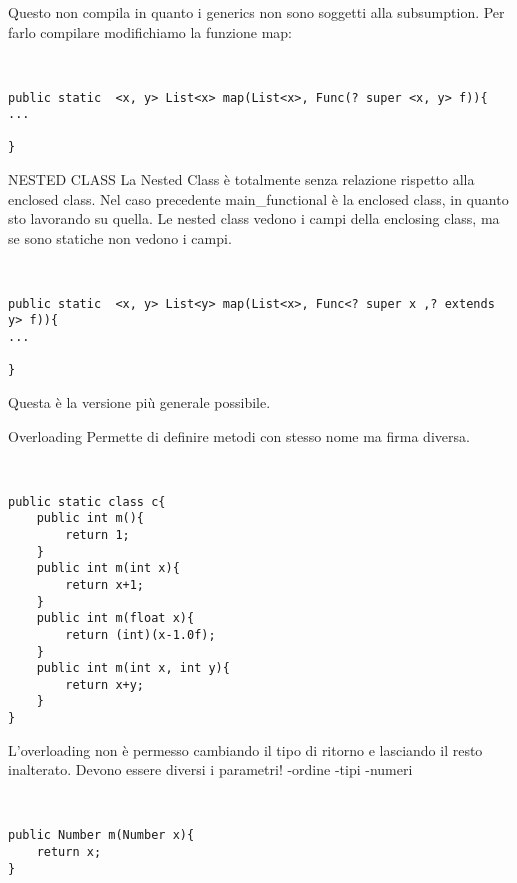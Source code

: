 Questo non compila in quanto i generics non sono soggetti alla subsumption. \newline
Per farlo compilare modifichiamo la funzione map: 


\begin{lstlisting}[basicstyle=\small,]


public static  <x, y> List<x> map(List<x>, Func(? super <x, y> f)){
...

}

\end{lstlisting}



NESTED CLASS \newline
La Nested Class è totalmente senza relazione rispetto alla enclosed class.\newline
Nel caso precedente main{\_}functional è la enclosed class, in quanto sto lavorando su quella. \newline
Le nested class vedono i campi della enclosing class, ma se sono statiche non vedono i campi. 

\begin{lstlisting}[basicstyle=\small,]


public static  <x, y> List<y> map(List<x>, Func<? super x ,? extends y> f)){
...

}

\end{lstlisting}
Questa è la versione più generale possibile. \newline

Overloading \newline
Permette di definire metodi con stesso nome ma firma diversa. 

\begin{lstlisting}[basicstyle=\small,]


public static class c{
	public int m(){
		return 1;
	}
	public int m(int x){
		return x+1;
	}
	public int m(float x){
		return (int)(x-1.0f);
	}
	public int m(int x, int y){
		return x+y;
	}		
}

\end{lstlisting}

L'overloading non è permesso cambiando il tipo di ritorno e lasciando il resto inalterato. Devono essere diversi i parametri! \newline
-ordine \newline
-tipi \newline
-numeri \newline


\begin{lstlisting}[basicstyle=\small,]


public Number m(Number x){
	return x;
}

\end{lstlisting}























